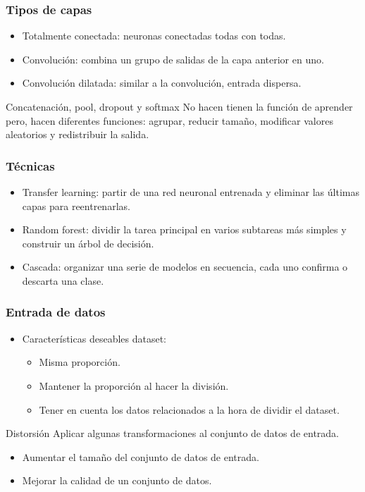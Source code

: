 \documentclass{beamer}
\begin{document}
\begin{frame}
\frametitle{Tipos de capas}

\begin{itemize}
\setlength\itemsep{1em}
\item Totalmente conectada: neuronas conectadas todas con todas.
\item Convolución: combina un grupo de salidas de la capa anterior en uno.
\item Convolución dilatada: similar a la convolución, entrada dispersa.
\end{itemize}

\begin{block}{Concatenación, pool, dropout y softmax}
No hacen tienen la función de aprender pero, hacen diferentes funciones: agrupar, reducir tamaño, modificar valores aleatorios y redistribuir la salida.
\end{block}

\end{frame}



\begin{frame}
\frametitle{Técnicas}

\begin{itemize}
\setlength\itemsep{1em}
\item Transfer learning: partir de una red neuronal entrenada y eliminar las últimas capas para reentrenarlas.
\item Random forest: dividir la tarea principal en varios subtareas más simples y construir un árbol de decisión.
\item Cascada: organizar una serie de modelos en secuencia, cada uno confirma o descarta una clase.
\end{itemize}

\end{frame}



\begin{frame}
\frametitle{Entrada de datos}

\begin{itemize}
\item Características deseables dataset:
\begin{itemize}
\item Misma proporción.
\item Mantener la proporción al hacer la división.
\item Tener en cuenta los datos relacionados a la hora de dividir el dataset.
\end{itemize}
\end{itemize}

\begin{block}{Distorsión}
Aplicar algunas transformaciones al conjunto de datos de entrada.
\begin{itemize}
\item Aumentar el tamaño del conjunto de datos de entrada.
\item Mejorar la calidad de un conjunto de datos.
\end{itemize}
\end{block}

\end{frame}
\end{document}

